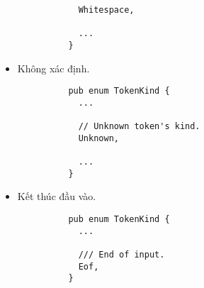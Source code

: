 \begin{itemize}
\begin{lstlisting}
            Whitespace,

            ...
          }
        \end{lstlisting}
  \item Không xác định.
        \begin{lstlisting}
          pub enum TokenKind {
            ...
            
            // Unknown token's kind.
            Unknown,
            
            ...
          }
        \end{lstlisting}
  \item Kết thúc đầu vào.
        \begin{lstlisting}
          pub enum TokenKind {
            ...
            
            /// End of input.
            Eof,
          }
        \end{lstlisting}
\end{itemize}

